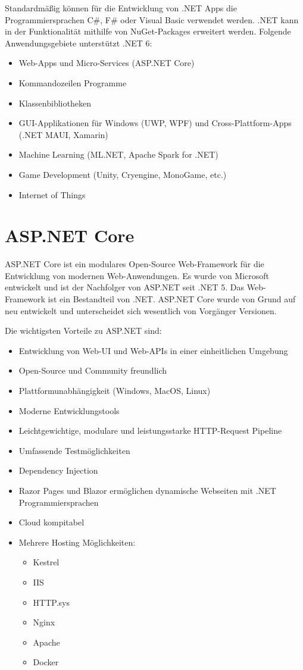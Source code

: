 Standardmäßig können für die Entwicklung von .NET Apps die Programmiersprachen C\#, F\# oder Visual Basic verwendet werden. 
.NET kann in der Funktionalität mithilfe von NuGet-Packages erweitert werden. Folgende Anwendungsgebiete unterstützt .NET 6:
\begin{itemize}
    \item Web-Apps und Micro-Services (ASP.NET Core)
    \item Kommandozeilen Programme
    \item Klassenbibliotheken
    \item GUI-Applikationen für Windows (UWP, WPF) und Cross-Plattform-Apps (.NET MAUI, Xamarin)
    \item Machine Learning (ML.NET, Apache Spark for .NET)
    \item Game Development (Unity, Cryengine, MonoGame, etc.)
    \item Internet of Things
\end{itemize}

\section{ASP.NET Core}
\cite{ASPNETCoreDocumentation}
\cite{RazorPagesITVision}
\cite{ASPNETCoreWikipedia}

ASP.NET Core ist ein modulares Open-Source Web-Framework für die Entwicklung von modernen Web-Anwendungen.
Es wurde von Microsoft entwickelt und ist der Nachfolger von ASP.NET seit .NET 5. Das Web-Framework ist ein Bestandteil von 
.NET. ASP.NET Core wurde von Grund auf neu entwickelt und unterscheidet sich wesentlich von Vorgänger Versionen. 

Die wichtigsten Vorteile zu ASP.NET sind:
\begin{itemize}
    \item Entwicklung von Web-UI und Web-APIs in einer einheitlichen Umgebung
    \item Open-Source und Community freundlich
    \item Plattformunabhängigkeit (Windows, MacOS, Linux)
    \item Moderne Entwicklungstools
    \item Leichtgewichtige, modulare und leistungsstarke HTTP-Request Pipeline
    \item Umfassende Testmöglichkeiten
    \item Dependency Injection
    \item Razor Pages und Blazor ermöglichen dynamische Webseiten mit .NET Programmiersprachen
    \item Cloud kompitabel
    \item Mehrere Hosting Möglichkeiten:
    \begin{itemize}
        \item Kestrel
        \item IIS
        \item HTTP.sys
        \item Nginx
        \item Apache
        \item Docker
    \end{itemize}
\end{itemize}

